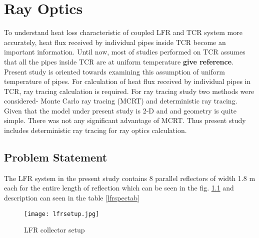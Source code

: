 \chapter{Ray Optics} \label{ch:RayOps}
To understand heat loss characteristic of coupled LFR and TCR system more accurately, heat flux received by individual pipes inside TCR become an important information. Until now, most of studies performed on TCR assumes that all the pipes inside TCR are at uniform temperature {\bf give reference}. Present study is oriented towards examining this assumption of uniform temperature of pipes. For calculation of heat flux received by individual pipes in TCR, ray tracing calculation is required. For ray tracing study two methods were considered- Monte Carlo ray tracing (MCRT) and deterministic ray tracing. Given that the model under present study is 2-D and and geometry is quite simple. There was not any significant advantage of MCRT. Thus present study includes deterministic ray tracing for ray optics calculation. 
\section{Problem Statement}
The LFR system in the present study contains 8 parallel reflectors of width 1.8 m each for the entire length of reflection which can be seen in the fig. \ref{lfrsetup} and description can seen in the table \ref{lfrspectab}


\begin{figure}[H]
\begin{center}
\texttt{[image: lfrsetup.jpg]}
\caption{LFR collector setup}
\end{center}
\label{lfrsetup}
\end{figure}


